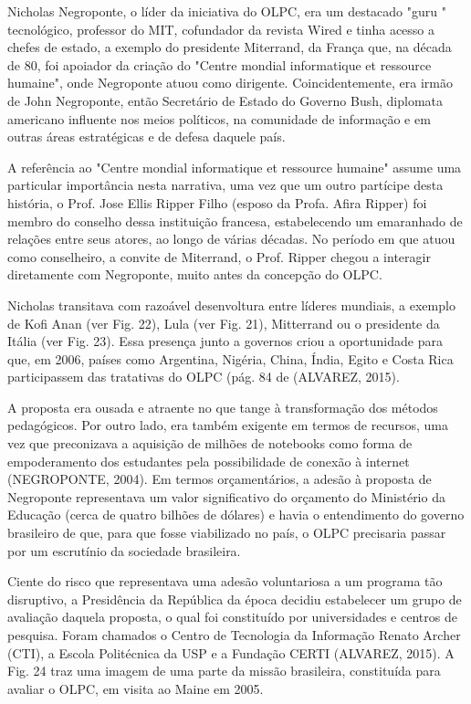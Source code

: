 Nicholas Negroponte, o líder da iniciativa do OLPC, era um destacado "guru " tecnológico, professor do MIT, cofundador da revista Wired e tinha acesso a chefes de estado, a exemplo do presidente Miterrand, da França que, na década de 80, foi apoiador da criação do "Centre mondial informatique et ressource humaine", onde Negroponte atuou como dirigente. Coincidentemente, era irmão de John Negroponte, então Secretário de Estado do Governo Bush, diplomata americano influente nos meios políticos, na comunidade de informação e em outras áreas estratégicas e de defesa daquele país.

A referência ao "Centre mondial informatique et ressource humaine" assume uma particular importância nesta narrativa, uma vez que um outro partícipe desta história, o Prof. Jose Ellis Ripper Filho (esposo da Profa. Afira Ripper) foi membro do conselho dessa instituição francesa, estabelecendo um emaranhado de relações entre seus atores, ao longo de várias décadas. No período em que atuou como conselheiro, a convite de Miterrand, o Prof. Ripper chegou a interagir diretamente com Negroponte, muito antes da concepção do OLPC.

Nicholas transitava com razoável desenvoltura entre líderes mundiais, a exemplo de Kofi Anan (ver Fig. 22), Lula (ver Fig. 21), Mitterrand ou o presidente da Itália (ver Fig. 23). Essa presença junto a governos criou a oportunidade para que, em 2006, países como Argentina, Nigéria, China, Índia, Egito e Costa Rica participassem das tratativas do OLPC  (pág. 84 de (ALVAREZ,  2015).

A proposta era ousada e atraente no que tange à transformação dos métodos pedagógicos. Por outro lado, era também exigente em termos de recursos, uma vez que preconizava a aquisição de milhões de notebooks como forma de empoderamento dos estudantes pela possibilidade de conexão à internet  (NEGROPONTE, 2004). Em termos orçamentários, a adesão à proposta de Negroponte representava um valor significativo do orçamento do Ministério da Educação (cerca de quatro bilhões de dólares) e havia o entendimento do governo brasileiro de que, para que fosse viabilizado no país, o OLPC precisaria passar por um escrutínio da sociedade brasileira.

Ciente do risco que representava uma adesão voluntariosa a um programa tão disruptivo, a Presidência da República da época decidiu estabelecer um grupo de avaliação  daquela proposta, o  qual foi constituído por universidades e centros de pesquisa. Foram chamados o Centro de Tecnologia da Informação Renato Archer (CTI), a Escola Politécnica da USP e a Fundação CERTI (ALVAREZ, 2015). A Fig. 24 traz uma imagem de uma parte da missão brasileira, constituída para avaliar o OLPC, em visita ao Maine em 2005.

